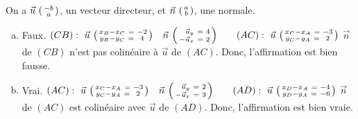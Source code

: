 \documentclass[12pt, a4paper]{article}
\begin{document}
    \begin{Exercise}[number={53}]
        On a $\vec{u}\ \begin{psmallmatrix}-b \\ a\end{psmallmatrix}$, un vecteur directeur, et $\vec{n}\ \begin{psmallmatrix}a \\ b\end{psmallmatrix}$, une normale.
       \begin{enumerate}[a)]
            \item	Faux. $(CB):\ \vec{u}\ \begin{psmallmatrix}x_B-x_C\ =& -2 \\ y_B-y_C\ =& 4\end{psmallmatrix} \quad \vec{n}\ \begin{psmallmatrix}\hphantom{-}\vec{u}_y\ =& 4 \\ -\vec{u}_x\ =& 2\end{psmallmatrix} \qquad (AC):\ \vec{u}\ \begin{psmallmatrix}x_C-x_A\ =& -3 \\ y_C-y_A\ =& 2\end{psmallmatrix}$ \smallbreak $\vec{n}$ de $(CB)$ n'est pas colinéaire à $\vec{u}$ de $(AC)$. Donc, l'affirmation est bien fausse.
            \item	Vrai. $(AC):\ \vec{u}\ \begin{psmallmatrix}x_C-x_A\ =& -3 \\ y_C-y_A\ =& 2\end{psmallmatrix} \quad \vec{n}\ \begin{psmallmatrix}\hphantom{-}\vec{u}_y\ =& 2 \\ -\vec{u}_x\ =& 3\end{psmallmatrix} \qquad (AD):\ \vec{u}\ \begin{psmallmatrix}x_D-x_A\ =& -4 \\ y_D-y_A\ =& -6\end{psmallmatrix}$ \smallbreak $\vec{n}$ de $(AC)$ est colinéaire avec $\vec{u}$ de $(AD)$. Donc, l'affirmation est bien vraie.
       \end{enumerate}
    \end{Exercise}
\end{document}
